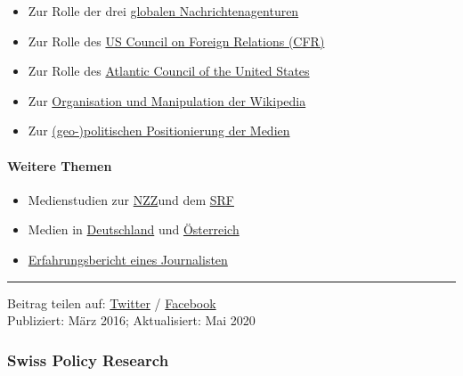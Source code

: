 \begin{itemize}
\tightlist
\item
  Zur Rolle der drei
  \href{https://swprs.org/der-propaganda-multiplikator/}{globalen
  Nachrichtenagenturen}
\item
  Zur Rolle des
  \href{https://swprs.org/das-american-empire-und-seine-medien/}{US
  Council on Foreign Relations (CFR)}
\item
  Zur Rolle des \href{https://swprs.org/atlantic-council/}{Atlantic
  Council of the United States}
\item
  Zur \href{https://swprs.org/propaganda-in-der-wikipedia/}{Organisation
  und Manipulation der Wikipedia}
\item
  Zur \href{https://swprs.org/medien-navigator/}{(geo-)politischen
  Positionierung der Medien}
\end{itemize}

\hypertarget{weitere-themen}{%
\paragraph{Weitere Themen}\label{weitere-themen}}

\begin{itemize}
\tightlist
\item
  Medienstudien zur \href{https://swprs.org/die-nzz-studie/}{NZZ}und dem
  \href{https://swprs.org/srf-propaganda-analyse/}{SRF}
\item
  Medien in
  \href{https://swprs.org/netzwerk-medien-deutschland/}{Deutschland} und
  \href{https://swprs.org/medien-in-oesterreich/}{Österreich}
\item
  \href{https://swprs.org/bericht-eines-journalisten/}{Erfahrungsbericht
  eines Journalisten}
\end{itemize}

\begin{center}\rule{0.5\linewidth}{\linethickness}\end{center}

Beitrag teilen auf:
\href{https://twitter.com/intent/tweet?url=https\%3A\%2F\%2Fswprs.org/netzwerk-medien-schweiz/}{Twitter}
/
\href{https://www.facebook.com/share.php?u=https://swprs.org/netzwerk-medien-schweiz/}{Facebook}\\
Publiziert: März 2016; Aktualisiert: Mai 2020

\hypertarget{swiss-policy-research}{%
\subsubsection{Swiss Policy Research}\label{swiss-policy-research}}

